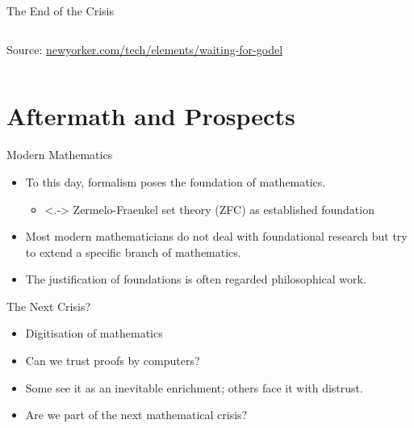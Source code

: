\documentclass{beamer}
\begin{document}
\begin{frame}{The End of the Crisis}
\begin{columns}[T,onlytextwidth]
\begin{column}{.49\textwidth}
		\scriptsize{Source: \url{newyorker.com/tech/elements/waiting-for-godel}}
 \end{column}
\end{columns}
\end{frame}
\section{Aftermath and Prospects}
\begin{frame}{Modern Mathematics}
    \begin{itemize}[<+->]
	\item To this day, formalism poses the foundation of mathematics.
	\begin{itemize}
		\item<.-> Zermelo-Fraenkel set theory (ZFC) as established foundation
	\end{itemize}
	\item Most modern mathematicians do not deal with foundational research but try to extend a specific branch of mathematics.
	\item The justification of foundations is often regarded philosophical work.
    \end{itemize}
\end{frame}
\begin{frame}{The Next Crisis?}
    \begin{itemize}[<+->]
	\item Digitisation of mathematics
	\item Can we trust proofs by computers?
	\item Some see it as an inevitable enrichment; others face it with distrust.
	\item Are we part of the next mathematical crisis?
    \end{itemize}
\end{frame}
\end{document}
